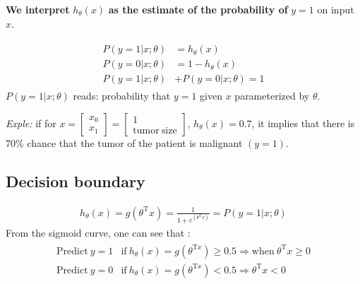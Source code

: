 \documentclass[a4paper,12pt]{report}
\begin{document}
\textbf{We interpret} $h_{\theta}(x)$ \textbf{as the estimate of the probability of} $y=1$ on input $x$.

\begin{align*}
\begin{split}
 P(y=1|x;\theta) & = h_{\theta}(x) \\
 P(y=0|x;\theta) & = 1 - h_{\theta}(x) \\
 P(y=1|x;\theta) & + P(y=0|x;\theta) = 1
\end{split}
\end{align*}
$P(y=1|x;\theta)$ reads: probability that $y=1$ given $x$ parameterized by $\theta$.

\textit{Exple:} if for $x=\left[ \begin{smallmatrix} x_0 \\ x_1 \end{smallmatrix} \right] = \left[ \begin{smallmatrix} 1 \\ \mathrm{tumor\ size} \end{smallmatrix} \right]$, $h_{\theta}(x)=0.7$, it implies that there is $70\%$ chance that the tumor of the patient is malignant $(y=1)$. \\

\subsection{Decision boundary}
\begin{align*}
h_{\theta}(x) = g(\theta^{\mathrm{T}}x) =\frac{1}{1+e^{(\theta^{\mathrm{T}}x)}} = P(y=1|x;\theta)
\end{align*}
From the sigmoid curve, one can see that :
\begin{align*}
\begin{split}
\mathrm{Predict \ } y=1 & \mathrm{if\ }  h_{\theta}(x)=g(\theta^{\mathrm{T}x}) \geq 0.5 \Rightarrow \mathrm{when \ } \theta^{\mathrm{T}} x  \geq 0  \\
\mathrm{Predict \ } y=0 & \mathrm{if\ } h_{\theta}(x)=g(\theta^{\mathrm{T}x}) < 0.5 \Rightarrow\theta^{\mathrm{T}}x < 0
\end{split}
\end{align*}
\end{document}
